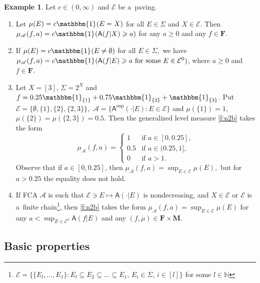 \documentclass[preprint,11pt]{elsarticle}
\theoremstyle{definition}
\newtheorem{example}[tw]{Example}
\newcommand\mN{{\mathbb N}}
\newcommand\bF{\mathbf{F}} %
\newcommand\bM{\mathbf{M}} %
\newcommand\cE{{\mathcal E}}
\newcommand\sA{\mathsf{A}}
\newcommand\aA[2][E]{\sA(#2|#1)}%
\newcommand\bA{\mathscr{A}}%
\newcommand\mub[1][\bA]{\mu_{#1}}
\renewcommand\ge{\geqslant}
\newcommand{\mI}[1]{\mathbbm{1}_{#1}}%
\newcommand{\tx}{\textstyle{}}
\begin{document}
\begin{example}\label{ex:4.3}
Let $c\in (0,\infty)$ and $\cE$ be a~paving.
    \begin{enumerate}[noitemsep]
     \item[(a)]
      Let $\mu(E)=c\mI{}(E=X)$ for all $E\in \Sigma$ and $X\in \cE.$
      Then $\mu_\bA(f,a)= c\mI{}(\aA[X]{f}\ge a)$ for any $a\ge 0$ and any $f\in\bF.$

    \item[(b)] If $\mu(E)=c\mI{}(E\neq \emptyset)$ for all $E\in \Sigma,$  we have $\mu_\bA(f,a)= c\mI{}(\aA[E]{f}\ge a\text{ for some }E\in \cE^0)$, where  $a\ge 0$ and $f\in\bF.$

        \item[(c)]
    Let $X=[3]$, $\Sigma=2^{X}$ and $f=0.25\mI{\{1\}}+0.75 \mI{\{2\}}+\mI{\{3\}}$. Put $\cE=\{\emptyset,\{1\},\{2\},\{2,3\}\},$     $\bA=\{\sA^{\sup}(\cdot|E)\colon E\in \cE\}$ and $\mu(\{1\})=1$, $\mu(\{2\})=\mu(\{2,3\})=0{.}5.$  Then
    the generalized level measure \eqref{f:n2b} takes the form
  \[
    \mub(f,a)=
    \begin{cases}
    1 & \text{if } a\in[0, 0{.}25], \\
    0{.}5      & \text{if }  a\in(0{.}25,1],\\
    0     & \text{if } a>1.
    \end{cases}
    \]
    Observe that if $a\in[0,0{.}25]$, then $\tx{\mub(f,a)=\sup_{E\in \cE} \mu(E)},$ but for $a>0.25$ the equality does not hold.

    \item[(d)] If FCA $\bA$ is such that $\cE \ni E\mapsto \sA(\cdot|E)$ is nondecreasing, and $X\in\cE$ or $\cE$ is a~finite chain\footnote{$\cE=\{\{E_l,\ldots,E_1\}\colon E_l\subseteq E_2\subseteq\ldots \subseteq E_1,\, E_i\in \Sigma,\, i\in [l]\}$ for some $l\in\mN$}, then \eqref{f:n2b} takes the form
    $\mub(f,a)=\tx{\sup_{E\in \cE} \mu(E)}$ for any $a<\tx{\sup_{E\in \cE^0} \aA{f}}$  and any $(f,\mu)\in\bF\times \bM.$
\end{enumerate}
\end{example}


\subsection{\textbf{Basic properties}}\label{sec:3.1}
\end{document}
